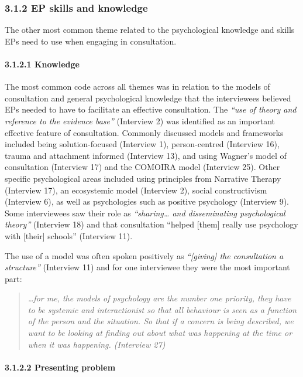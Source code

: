 \documentclass[
]{article}
\begin{document}
\hypertarget{ep-skills-and-knowledge}{%
\subsubsection{3.1.2 EP skills and
knowledge}\label{ep-skills-and-knowledge}}

The other most common theme related to the psychological knowledge and
skills EPs need to use when engaging in consultation.

\hypertarget{knowledge}{%
\paragraph{3.1.2.1 Knowledge}\label{knowledge}}

The most common code across all themes was in relation to the models of
consultation and general psychological knowledge that the interviewees
believed EPs needed to have to facilitate an effective consultation. The
\emph{``use of theory and reference to the evidence base''} (Interview
2) was identified as an important effective feature of consultation.
Commonly discussed models and frameworks included being solution-focused
(Interview 1), person-centred (Interview 16), trauma and attachment
informed (Interview 13), and using Wagner's model of consultation
(Interview 17) and the COMOIRA model (Interview 25). Other specific
psychological areas included using principles from Narrative Therapy
(Interview 17), an ecosystemic model (Interview 2), social
constructivism (Interview 6), as well as psychologies such as positive
psychology (Interview 9). Some interviewees saw their role as
\emph{``sharing\ldots{} and disseminating psychological theory''}
(Interview 18) and that consultation ``helped {[}them{]} really use
psychology with {[}their{]} schools'' (Interview 11).

The use of a model was often spoken positively as \emph{``{[}giving{]}
the consultation a structure''} (Interview 11) and for one interviewee
they were the most important part:

\begin{quote}
\emph{\ldots for me, the models of psychology are the number one
priority, they have to be systemic and interactionist so that all
behaviour is seen as a function of the person and the situation. So that
if a concern is being described, we want to be looking at finding out
about what was happening at the time or when it was happening.
(Interview 27)}
\end{quote}

\hypertarget{presenting-problem}{%
\paragraph{3.1.2.2 Presenting problem}\label{presenting-problem}}
\end{document}
